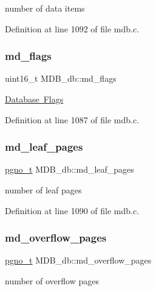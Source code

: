 number of data items 

Definition at line 1092 of file mdb.\+c.

\mbox{\label{struct_m_d_b__db_a91a11c5c8034bd175eb0dd01da528981}} 
\subsubsection{\texorpdfstring{md\+\_\+flags}{md\_flags}}
{\footnotesize\ttfamily uint16\+\_\+t M\+D\+B\+\_\+db\+::md\+\_\+flags}

\mbox{\hyperlink{group__mdb__dbi__open}{Database Flags}} 

Definition at line 1087 of file mdb.\+c.

\mbox{\label{struct_m_d_b__db_ad5d881546cdc62307869f6aa30b83be9}} 
\subsubsection{\texorpdfstring{md\+\_\+leaf\+\_\+pages}{md\_leaf\_pages}}
{\footnotesize\ttfamily \mbox{\hyperlink{group__internal_gadb65f0424c9d3827bf6409087ad555cd}{pgno\+\_\+t}} M\+D\+B\+\_\+db\+::md\+\_\+leaf\+\_\+pages}

number of leaf pages 

Definition at line 1090 of file mdb.\+c.

\mbox{\label{struct_m_d_b__db_a2142ebea501d00b132d6d4fadf6fbd24}} 
\subsubsection{\texorpdfstring{md\+\_\+overflow\+\_\+pages}{md\_overflow\_pages}}
{\footnotesize\ttfamily \mbox{\hyperlink{group__internal_gadb65f0424c9d3827bf6409087ad555cd}{pgno\+\_\+t}} M\+D\+B\+\_\+db\+::md\+\_\+overflow\+\_\+pages}

number of overflow pages 

